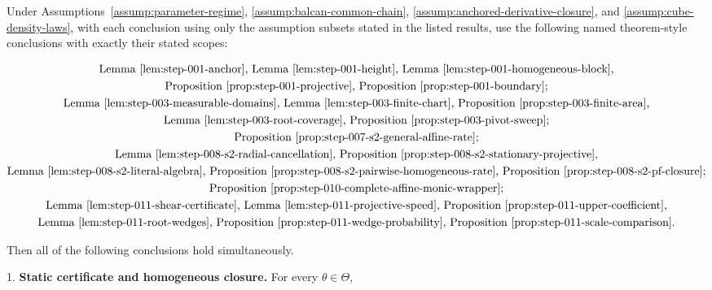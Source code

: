 \begin{proposition}
\label{prop:step-012-anchored-coefficient-sweep}

Under Assumptions~\ref{assump:parameter-regime}, \ref{assump:balcan-common-chain},
\ref{assump:anchored-derivative-closure}, and \ref{assump:cube-density-laws}, with each conclusion using only
the assumption subsets stated in the listed results, use the following named
theorem-style conclusions with exactly their stated scopes:

\begin{equation}
\label{eq:appendix-display-373}
\begin{gathered}
\text{Lemma~\ref{lem:step-001-anchor}, Lemma~\ref{lem:step-001-height},
Lemma~\ref{lem:step-001-homogeneous-block},}\\
\text{Proposition~\ref{prop:step-001-projective}, Proposition~\ref{prop:step-001-boundary};}\\
\text{Lemma~\ref{lem:step-003-measurable-domains}, Lemma~\ref{lem:step-003-finite-chart},
Proposition~\ref{prop:step-003-finite-area},}\\
\text{Lemma~\ref{lem:step-003-root-coverage}, Proposition~\ref{prop:step-003-pivot-sweep};}\\
\text{Proposition~\ref{prop:step-007-s2-general-affine-rate};}\\
\text{Lemma~\ref{lem:step-008-s2-radial-cancellation},
Proposition~\ref{prop:step-008-s2-stationary-projective},}\\
\text{Lemma~\ref{lem:step-008-s2-literal-algebra},
Proposition~\ref{prop:step-008-s2-pairwise-homogeneous-rate},
Proposition~\ref{prop:step-008-s2-pf-closure};}\\
\text{Proposition~\ref{prop:step-010-complete-affine-monic-wrapper};}\\
\text{Lemma~\ref{lem:step-011-shear-certificate}, Lemma~\ref{lem:step-011-projective-speed},
Proposition~\ref{prop:step-011-upper-coefficient},}\\
\text{Lemma~\ref{lem:step-011-root-wedges},
Proposition~\ref{prop:step-011-wedge-probability},
Proposition~\ref{prop:step-011-scale-comparison}.}
\end{gathered}
\end{equation}

Then all of the following conclusions hold simultaneously.

1. \textbf{Static certificate and homogeneous closure.} For every \(\theta\in\Theta\),
   

\end{proposition}
